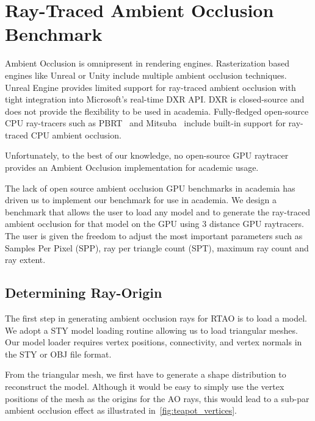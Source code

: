 \section{Ray-Traced Ambient Occlusion Benchmark}
\label{sec:ao_benchmark_intro_inline}

Ambient Occlusion is omnipresent in rendering engines. Rasterization based engines like Unreal or Unity include multiple ambient occlusion techniques. Unreal Engine provides limited support for ray-traced ambient occlusion with tight integration into Microsoft's real-time DXR API. DXR is closed-source and does not provide the flexibility to be used in academia. Fully-fledged open-source CPU ray-tracers such as PBRT~\cite{Pharr:2010:PBR:1854996} and Mitsuba~\cite{10.1145/3355089.3356498} include built-in support for ray-traced CPU ambient occlusion.

Unfortunately, to the best of our knowledge, no open-source GPU raytracer provides an Ambient Occlusion implementation for academic usage. 

The lack of open source ambient occlusion GPU benchmarks in academia has driven us to implement our benchmark for use in academia. 
We design a benchmark that allows the user to load any model and to generate the ray-traced ambient occlusion for that model on the GPU using 3 distance GPU raytracers. The user is given the freedom to adjust the most important parameters such as Samples Per Pixel (SPP), ray per triangle count (SPT), maximum ray count and ray extent.

\subsection{Determining Ray-Origin}
\label{subsec:ray_orig}

The first step in generating ambient occlusion rays for RTAO is to load a model. We adopt a STY model loading routine allowing us to load triangular meshes. Our model loader requires vertex positions, connectivity, and vertex normals in the STY or OBJ file format. 

From the triangular mesh, we first have to generate a shape distribution to reconstruct the model. Although it would be easy to simply use the vertex positions of the mesh as the origins for the AO rays, this would lead to a sub-par ambient occlusion effect as illustrated in~\autoref{fig:teapot_vertices}.

